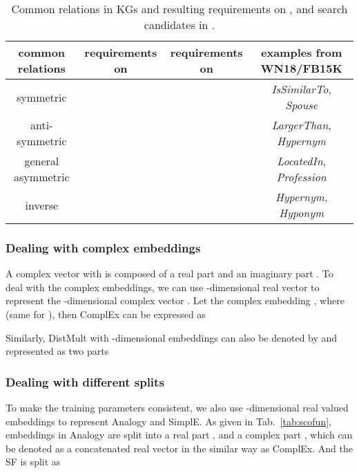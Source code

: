 \documentclass[conference]{IEEEtran}
\begin{document}
{\begin{table*}[ht]
\caption{Common relations in KGs and resulting requirements on , and search candidates in .}
\centering
\vspace{-8px}
\renewcommand{\arraystretch}{1.2}
\label{tab:comrel}
\begin{tabular}{c | c | c | c}
	\hline
	                         common relations                          & requirements on                                                             & requirements on        & examples from WN18/FB15K                \\ \hline
	                symmetric \cite{yang2014embedding}                 &                           &     & \textit{IsSimilarTo}, \textit{Spouse}   \\ \hline
	anti-symmetric \cite{trouillon2017knowledge,nickel2016holographic} &                          &     & \textit{LargerThan}, \textit{Hypernym}  \\ \hline
	           general asymmetric \cite{liu2017analogical}             &                         &  & \textit{LocatedIn}, \textit{Profession} \\ \hline
	                 inverse \cite{kazemi2018simple}                   &  &    & \textit{Hypernym}, \textit{Hyponym}     \\ \hline
\end{tabular}
\vspace{-15px}
\end{table*}


\subsubsection{Dealing with complex embeddings}
A complex vector  with 
is composed of a real part  and an imaginary part .
To deal with the complex embeddings, we can use -dimensional real vector  to represent the -dimensional complex vector  \cite{trouillon2017knowledge,balavzevic2019tucker}.
Let the complex embedding ,
where  (same for ),
then ComplEx can be expressed  as 

Similarly, DistMult \cite{yang2014embedding} with -dimensional embeddings can also be denoted by  and represented as two parts


\subsubsection{Dealing with different splits}
To make the training parameters consistent,
we also use -dimensional real valued embeddings to represent Analogy and SimplE.
As given in Tab.~\ref{tab:scofun},
embeddings in Analogy \cite{liu2017analogical} are split into a real part ,
and a complex part ,
which can be denoted as a concatenated real vector 
in the similar way as ComplEx. And the SF is split as

}
\end{document}
